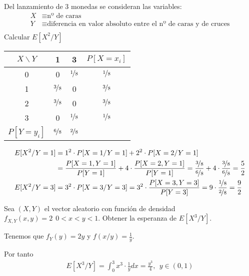 \begin{ejercicio} Del lanzamiento de 3 monedas se consideran las variables:
    \begin{align*}
        X &\equiv \text{nº de caras}\\
        Y &\equiv \text{diferencia en valor absoluto entre el nº de caras y de cruces}\\
    \end{align*}
    Calcular $E[X^2/Y]$
    \endsquare
    \begin{center}
        \begin{tabular}{c|cc|c}
            $X\backslash Y$ & 1 & 3 & $P[X=x_i]$\\
            \hline
            0 & 0 & $\nicefrac{1}{8}$ & $\nicefrac{1}{8}$\\
            1 & $\nicefrac{3}{8}$ & 0 & $\nicefrac{3}{8}$\\
            2 & $\nicefrac{3}{8}$ & 0 & $\nicefrac{3}{8}$\\
            3 & 0 & $\nicefrac{1}{8}$ & $\nicefrac{1}{8}$\\
            \hline
            $P[Y=y_i]$ & $\nicefrac{6}{8}$& $\nicefrac{2}{8}$ & \\
        \end{tabular}
    \end{center}
    \begin{align*}
        E[X^2/Y=1] &= 1^2 \cdot P[X=1/Y=1] + 2^2 \cdot P[X=2 / Y=1] \\&= \frac{P[X=1, Y=1]}{P[Y=1]} + 4 \cdot \frac{P[X=2, Y=1]}{P[Y=1]} =
         \frac{\nicefrac{3}{8}}{\nicefrac{6}{8}} + 4 \cdot \frac{\nicefrac{3}{8}}{\nicefrac{6}{8}} = \frac{5}{2}\\
        E[X^2/Y=3] &= 3^2 \cdot P[X=3/Y=3] = 3^2 \cdot \frac{P[X=3, Y=3]}{P[Y=3]} = 9 \cdot \frac{\nicefrac{1}{8}}{\nicefrac{2}{8}} = \frac{9}{2}
    \end{align*}
\end{ejercicio}

\begin{ejercicio}
    Sea $(X, Y)$ el vector aleatorio con función de densidad $f_{X,Y}(x,y) = 2\ \  0<x<y<1$. Obtener la esperanza de $E[X^3 / Y]$.
    \endsquare
    
    Tenemos que $f_Y(y) =2y$ y $f(x/y)=\frac{1}{y}$.

    Por tanto
    \begin{gather*}
        E[X^3 / Y] = \int_0^3 x^3 \cdot \frac{1}{y} dx = \frac{y^3}{4},\ \ y \in (0,1)
    \end{gather*}
\end{ejercicio}


